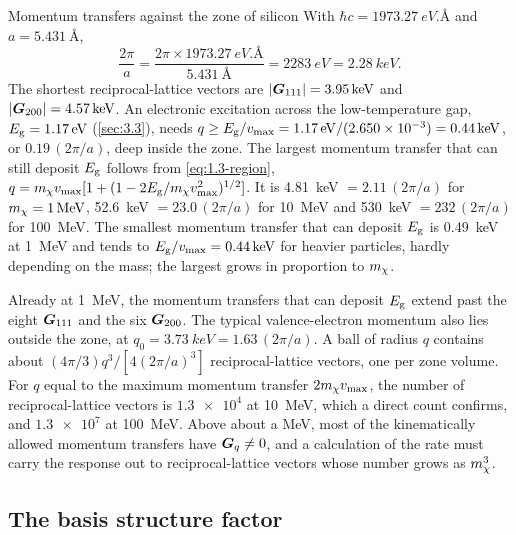 \begin{workedexample}{Momentum transfers against the zone of silicon}\label{we:3-scales}
With $\hbar c = \SI{1973.27}{eV.\angstrom}$ and $a = \SI{5.431}{\angstrom}$,
\begin{equation*}
  \frac{2\pi}{a} = \frac{2\pi \times \SI{1973.27}{eV.\angstrom}}{\SI{5.431}{\angstrom}} = \SI{2283}{eV} = \SI{2.28}{keV} .
\end{equation*}
The shortest reciprocal-lattice vectors are $|\bm{G}_{111}| = \SI{3.95}{keV}$ and $|\bm{G}_{200}| = \SI{4.57}{keV}$. An electronic excitation across the low-temperature gap, $E_{\mathrm{g}} = \SI{1.17}{eV}$ (\cref{sec:3.3}), needs $q \ge E_{\mathrm{g}}/v_{\mathrm{max}} = \SI{1.17}{eV}/(2.650\times10^{-3}) = \SI{0.44}{keV}$, or $0.19\,(2\pi/a)$, deep inside the zone. The largest momentum transfer that can still deposit $E_{\mathrm{g}}$ follows from \cref{eq:1.3-region}, $q = m_{\chi} v_{\mathrm{max}}[1 + (1 - 2E_{\mathrm{g}}/m_{\chi} v_{\mathrm{max}}^2)^{1/2}]$. It is \SI{4.81}{keV} $= 2.11\,(2\pi/a)$ for $m_{\chi} = \SI{1}{MeV}$, \SI{52.6}{keV} $= 23.0\,(2\pi/a)$ for \SI{10}{MeV} and \SI{530}{keV} $= 232\,(2\pi/a)$ for \SI{100}{MeV}. The smallest momentum transfer that can deposit $E_{\mathrm{g}}$ is \SI{0.49}{keV} at \SI{1}{MeV} and tends to $E_{\mathrm{g}}/v_{\mathrm{max}} = \SI{0.44}{keV}$ for heavier particles, hardly depending on the mass; the largest grows in proportion to $m_{\chi}$.

Already at \SI{1}{MeV}, the momentum transfers that can deposit $E_{\mathrm{g}}$ extend past the eight $\bm{G}_{111}$ and the six $\bm{G}_{200}$. The typical valence-electron momentum also lies outside the zone, at $q_0 = \SI{3.73}{keV} = 1.63\,(2\pi/a)$. A ball of radius $q$ contains about $(4\pi/3)q^3/[4(2\pi/a)^3]$ reciprocal-lattice vectors, one per zone volume. For $q$ equal to the maximum momentum transfer $2m_{\chi} v_{\mathrm{max}}$, the number of reciprocal-lattice vectors is $\num{1.3e4}$ at \SI{10}{MeV}, which a direct count confirms, and $\num{1.3e7}$ at \SI{100}{MeV}. Above about a MeV, most of the kinematically allowed momentum transfers have $\bm{G}_q \neq 0$, and a calculation of the rate must carry the response out to reciprocal-lattice vectors whose number grows as $m_{\chi}^3$.
\end{workedexample}

\subsection{The basis structure factor}

